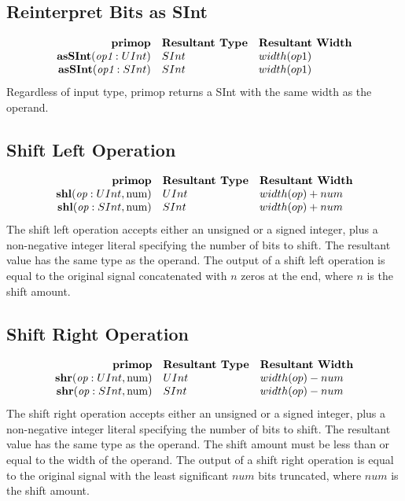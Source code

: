 \documentclass[12pt]{article}
\begin{document}
\subsection{Reinterpret Bits as SInt}
\[
\begin{array}{rll}
\text{\bf primop} & \text{\bf Resultant Type} & \text{\bf Resultant Width} \\
\text{\bf asSInt}(\text{\em op1}:UInt)     & SInt & width(op1) \\
\text{\bf asSInt}(\text{\em op1}:SInt)     & SInt & width(op1) \\
\end{array}
\]
Regardless of input type, primop returns a SInt with the same width as the operand.

\subsection{Shift Left Operation}
\[
\begin{array}{rll}
\text{\bf primop} & \text{\bf Resultant Type} & \text{\bf Resultant Width} \\
\text{\bf shl}(\text{\em op}:UInt, \text{num})      & UInt & width(op) + num \\
\text{\bf shl}(\text{\em op}:SInt, \text{num})      & SInt & width(op) + num \\
\end{array}
\]
The shift left operation accepts either an unsigned or a signed integer, plus a non-negative integer literal specifying the number of bits to shift.
The resultant value has the same type as the operand.
The output of a shift left operation is equal to the original signal concatenated with $n$ zeros at the end, where $n$ is the shift amount.

\subsection{Shift Right Operation}
\[
\begin{array}{rll}
\text{\bf primop} & \text{\bf Resultant Type} & \text{\bf Resultant Width} \\
\text{\bf shr}(\text{\em op}:UInt, \text{num})      & UInt & width(op) - num \\
\text{\bf shr}(\text{\em op}:SInt, \text{num})      & SInt & width(op) - num \\
\end{array}
\]
The shift right operation accepts either an unsigned or a signed integer, plus a non-negative integer literal specifying the number of bits to shift.
The resultant value has the same type as the operand.
The shift amount must be less than or equal to the width of the operand.
The output of a shift right operation is equal to the original signal with the least significant $num$ bits truncated, where $num$ is the shift amount.
\end{document}

